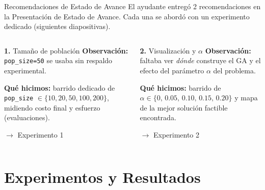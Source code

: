 \documentclass[aspectratio=169, 12pt]{beamer}
\newcommand{\acento}[1]{\textcolor{Verde}{\textbf{#1}}}
\newcommand{\acentob}[1]{\textcolor{Cian}{#1}}
\newcommand{\gris}[1]{\textcolor{GrisAzul}{#1}}
\begin{document}
\begin{frame}{Recomendaciones de Estado de Avance}
  \footnotesize\gris{El ayudante entregó 2 recomendaciones en la Presentación de Estado de Avance. Cada una se abordó con un experimento dedicado (siguientes diapositivas).}
  \vspace{0.6em}
  \begin{columns}[T]
    \begin{block}{\acento{1.} Tamaño de población}
      \footnotesize
      \textbf{Observación:} \texttt{pop\_size=50} se usaba sin respaldo experimental.
      \vspace{0.4em}

      \textbf{Qué hicimos:} barrido dedicado de \texttt{pop\_size} $\in\{10,20,50,100,200\}$, midiendo costo final y esfuerzo (evaluaciones).
      \vspace{0.6em}

      \acentob{$\rightarrow$ Experimento 1}
    \end{block}

    \begin{block}{\acento{2.} Visualización y $\alpha$}
      \footnotesize
      \textbf{Observación:} faltaba ver \emph{dónde} construye el GA y el efecto del parámetro $\alpha$ del problema.
      \vspace{0.4em}

      \textbf{Qué hicimos:} barrido de $\alpha \in \{0,\,0.05,\,0.10,\,0.15,\,0.20\}$ y mapa de la mejor solución factible encontrada.
      \vspace{0.6em}

      \acentob{$\rightarrow$ Experimento 2}
    \end{block}
  \end{columns}
\end{frame}

\section{Experimentos y Resultados}
\end{document}
